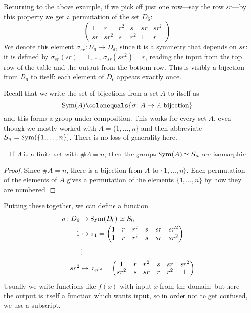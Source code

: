 Returning to the above example, if we pick off just one row---say the row $sr$---by this property we get a permutation of the set $D_6$:
\begin{equation}  \label{eqn:sr}
\begin{pmatrix}
1 & r & r^2 & s & sr & sr^2 \\
sr & sr^2 & s & r^2 & 1 & r 
\end{pmatrix} 
\end{equation}
We denote this element $\sigma_{sr} \colon D_6 \to D_6$, since it is a symmetry that depends on $sr$: it is defined by $\sigma_{sr}(sr) = 1$, \dots, $\sigma_{sr}(sr^2)=r$, reading the input from the top row of the table and the output from the bottom row.  This is visibly a bijection from $D_6$ to itself: each element of $D_6$ appears exactly once.  

Recall that we write the set of bijections from a set $A$ to itself as
\[ \Sym(A) \colonequals \{\sigma \colon A \to A \textup{ bijection}\} \]
and this forms a group under composition.  This works for every set $A$, even though we mostly worked with $A=\{1,\dots,n\}$ and then abbreviate $S_n=\operatorname{Sym}(\{1,\dots,n\})$.  There is no loss of generality here.

\begin{lem}~\label{lem:An}
If $A$ is a finite set with $\#A=n$, then the groups $\operatorname{Sym}(A) \simeq S_n$ are isomorphic.
\end{lem}

\begin{proof}
Since $\#A=n$, there is a bijection from $A$ to $\{1,\dots,n\}$.  Each permutation of the elements of $A$ gives a permutation of the elements $\{1,\dots,n\}$ by how they are numbered.  
\end{proof}

Putting these together, we can define a function
\begin{equation}~\label{eqn:D3map}
\begin{aligned}
\sigma \colon D_6 &\to \operatorname{Sym}(D_6) \simeq S_6 \\
1 &\mapsto \sigma_1 = \begin{pmatrix}
1 & r & r^2 & s & sr & sr^2 \\
1 & r & r^2 & s & sr & sr^2
\end{pmatrix} \\
&\vdots \\
sr^2 &\mapsto \sigma_{sr^2} = \begin{pmatrix}
1 & r & r^2 & s & sr & sr^2 \\
sr^2 & s & sr & r & r^2 & 1
\end{pmatrix} 
\end{aligned}
\end{equation}
Usually we write functions like $f(x)$ with input $x$ from the domain; but here the output is itself a function which wants input, so in order not to get confused, we use a subscript.  

